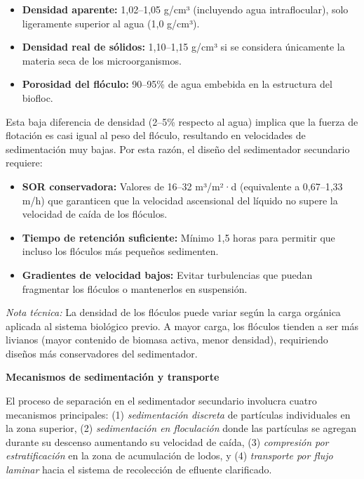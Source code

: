 \documentclass[12pt,a4paper]{article}
\begin{document}
\begin{itemize}[noitemsep,leftmargin=2em]
    \item \textbf{Densidad aparente:} 1,02--1,05 g/cm³ (incluyendo agua intraflocular), solo ligeramente superior al agua (1,0 g/cm³).
    \item \textbf{Densidad real de sólidos:} 1,10--1,15 g/cm³ si se considera únicamente la materia seca de los microorganismos.
    \item \textbf{Porosidad del flóculo:} 90--95\% de agua embebida en la estructura del biofloc.
\end{itemize}

Esta baja diferencia de densidad (2--5\% respecto al agua) implica que la fuerza de flotación es casi igual al peso del flóculo, resultando en velocidades de sedimentación muy bajas. Por esta razón, el diseño del sedimentador secundario requiere:

\begin{itemize}[noitemsep,leftmargin=2em]
    \item \textbf{SOR conservadora:} Valores de 16--32 m³/m²·d (equivalente a 0,67--1,33 m/h) que garanticen que la velocidad ascensional del líquido no supere la velocidad de caída de los flóculos.
    \item \textbf{Tiempo de retención suficiente:} Mínimo 1,5 horas para permitir que incluso los flóculos más pequeños sedimenten.
    \item \textbf{Gradientes de velocidad bajos:} Evitar turbulencias que puedan fragmentar los flóculos o mantenerlos en suspensión.
\end{itemize}

\textit{Nota técnica:} La densidad de los flóculos puede variar según la carga orgánica aplicada al sistema biológico previo. A mayor carga, los flóculos tienden a ser más livianos (mayor contenido de biomasa activa, menor densidad), requiriendo diseños más conservadores del sedimentador.

\textbf{Mecanismos de sedimentación y transporte}

El proceso de separación en el sedimentador secundario involucra cuatro mecanismos principales: (1) \textit{sedimentación discreta} de partículas individuales en la zona superior, (2) \textit{sedimentación en floculación} donde las partículas se agregan durante su descenso aumentando su velocidad de caída, (3) \textit{compresión por estratificación} en la zona de acumulación de lodos, y (4) \textit{transporte por flujo laminar} hacia el sistema de recolección de efluente clarificado.
\end{document}
